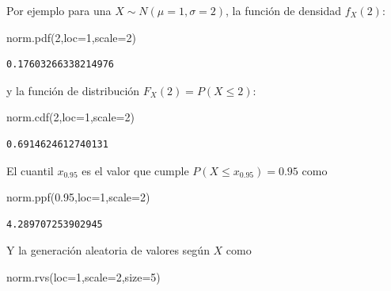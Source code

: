 \documentclass[
  letterpaper,
  DIV=11,
  numbers=noendperiod]{scrreprt}
\newenvironment{Shaded}{\begin{snugshade}}{\end{snugshade}}
\newcommand{\DecValTok}[1]{\textcolor[rgb]{0.68,0.00,0.00}{#1}}
\newcommand{\FloatTok}[1]{\textcolor[rgb]{0.68,0.00,0.00}{#1}}
\newcommand{\NormalTok}[1]{\textcolor[rgb]{0.00,0.23,0.31}{#1}}
\newcommand{\OperatorTok}[1]{\textcolor[rgb]{0.37,0.37,0.37}{#1}}
\begin{document}
Por ejemplo para una \(X\sim N(\mu=1,\sigma=2)\), la función de densidad
\(f_X(2)\):

\begin{Shaded}
\begin{Highlighting}[]
\NormalTok{norm.pdf(}\DecValTok{2}\NormalTok{,loc}\OperatorTok{=}\DecValTok{1}\NormalTok{,scale}\OperatorTok{=}\DecValTok{2}\NormalTok{)}
\end{Highlighting}
\end{Shaded}

\begin{verbatim}
0.17603266338214976
\end{verbatim}

y la función de distribución \(F_X(2) = P(X\leq 2)\):

\begin{Shaded}
\begin{Highlighting}[]
\NormalTok{norm.cdf(}\DecValTok{2}\NormalTok{,loc}\OperatorTok{=}\DecValTok{1}\NormalTok{,scale}\OperatorTok{=}\DecValTok{2}\NormalTok{)}
\end{Highlighting}
\end{Shaded}

\begin{verbatim}
0.6914624612740131
\end{verbatim}

El cuantil \(x_{0.95}\) es el valor que cumple
\(P(X\leq x_{0.95})=0.95\) como

\begin{Shaded}
\begin{Highlighting}[]
\NormalTok{norm.ppf(}\FloatTok{0.95}\NormalTok{,loc}\OperatorTok{=}\DecValTok{1}\NormalTok{,scale}\OperatorTok{=}\DecValTok{2}\NormalTok{)}
\end{Highlighting}
\end{Shaded}

\begin{verbatim}
4.289707253902945
\end{verbatim}

Y la generación aleatoria de valores según \(X\) como

\begin{Shaded}
\begin{Highlighting}[]
\NormalTok{norm.rvs(loc}\OperatorTok{=}\DecValTok{1}\NormalTok{,scale}\OperatorTok{=}\DecValTok{2}\NormalTok{,size}\OperatorTok{=}\DecValTok{5}\NormalTok{)}
\end{Highlighting}
\end{Shaded}
\end{document}
